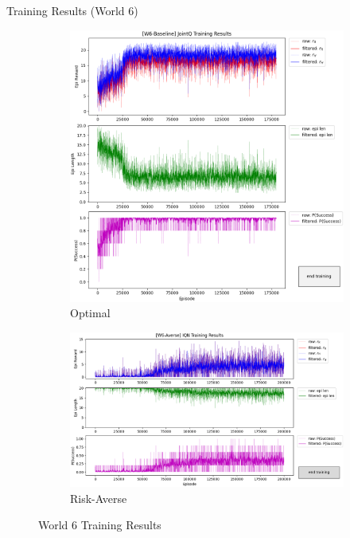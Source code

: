 \documentclass[aspectratio=1610, xcolor=dvipsnames]{packages/beamer}
\begin{document}
\begin{frame}{Training Results (World 6)}
     \begin{figure}
     \centering
          \begin{subfigure}[b]{\Wfig\textwidth}  \centering
              \includegraphics[width=\textwidth]{../results/IDQN_W6/Fig_W6_JointQ_Baseline}
              \caption{Optimal} \label{fig:W6baseline}
          \end{subfigure}
          \hfill
         \begin{subfigure}[b]{\Wfig\textwidth} \centering
             \includegraphics[width=\textwidth]{../results/IDQN_W6/Fig_W6_JointQ_Averse}
             \caption{Risk-Averse} \label{fig:W6averse}
         \end{subfigure}
    \caption{World 6 Training Results}
    \label{fig:W6}
    \end{figure}
\end{frame}
\end{document}
